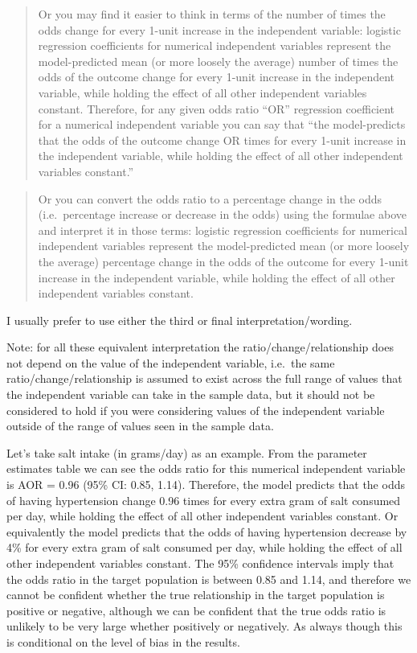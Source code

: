 \documentclass[
]{book}
\begin{document}
\begin{quote}
Or you may find it easier to think in terms of the number of times the odds change for every 1-unit increase in the independent variable: logistic regression coefficients for numerical independent variables represent the model-predicted mean (or more loosely the average) number of times the odds of the outcome change for every 1-unit increase in the independent variable, while holding the effect of all other independent variables constant. Therefore, for any given odds ratio ``OR'' regression coefficient for a numerical independent variable you can say that ``the model-predicts that the odds of the outcome change OR times for every 1-unit increase in the independent variable, while holding the effect of all other independent variables constant.''
\end{quote}

\begin{quote}
Or you can convert the odds ratio to a percentage change in the odds (i.e.~percentage increase or decrease in the odds) using the formulae above and interpret it in those terms: logistic regression coefficients for numerical independent variables represent the model-predicted mean (or more loosely the average) percentage change in the odds of the outcome for every 1-unit increase in the independent variable, while holding the effect of all other independent variables constant.
\end{quote}

I usually prefer to use either the third or final interpretation/wording.

Note: for all these equivalent interpretation the ratio/change/relationship does not depend on the value of the independent variable, i.e.~the same ratio/change/relationship is assumed to exist across the full range of values that the independent variable can take in the sample data, but it should not be considered to hold if you were considering values of the independent variable outside of the range of values seen in the sample data.

Let's take salt intake (in grams/day) as an example. From the parameter estimates table we can see the odds ratio for this numerical independent variable is AOR = 0.96 (95\% CI: 0.85, 1.14). Therefore, the model predicts that the odds of having hypertension change 0.96 times for every extra gram of salt consumed per day, while holding the effect of all other independent variables constant. Or equivalently the model predicts that the odds of having hypertension decrease by 4\% for every extra gram of salt consumed per day, while holding the effect of all other independent variables constant. The 95\% confidence intervals imply that the odds ratio in the target population is between 0.85 and 1.14, and therefore we cannot be confident whether the true relationship in the target population is positive or negative, although we can be confident that the true odds ratio is unlikely to be very large whether positively or negatively. As always though this is conditional on the level of bias in the results.
\end{document}
